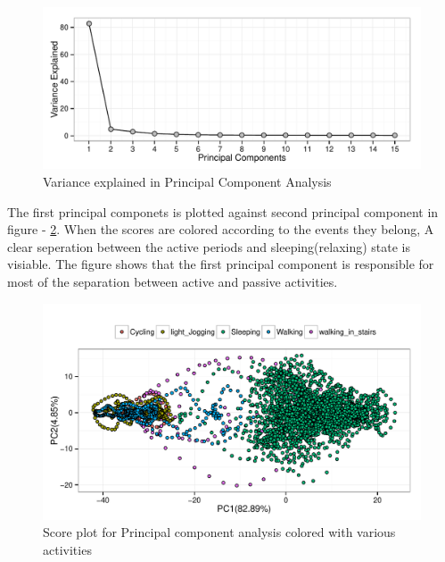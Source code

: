 \documentclass[a4paper, 11pt]{report}\usepackage[]{graphicx}\usepackage[]{color}
\makeatletter
\def\maxwidth{ %
  \ifdim\Gin@nat@width>\linewidth
    \linewidth
  \else
    \Gin@nat@width
  \fi
}
\newenvironment{knitrout}{}{} %
\numberwithin{figure}{section}
\makeatother
\begin{document}
\begin{knitrout}
\color{fgcolor}\begin{figure}[H]
\includegraphics[width=\maxwidth]{figure/pca_plot-1} \caption[Variance explained in Principal Component Analysis]{Variance explained in Principal Component Analysis}\label{fig:pca.plot}
\end{figure}


\end{knitrout}

The first principal componets is plotted against second principal component in figure - \ref{fig:pca.score.plot}. When the scores are colored according to the events they belong, A clear seperation between the active periods and sleeping(relaxing) state is visiable. The figure shows that the first principal component is responsible for most of the separation between active and passive activities.

\begin{knitrout}
\color{fgcolor}\begin{figure}[H]
\includegraphics[width=\maxwidth]{figure/pca_score_plot-1} \caption[Score plot for Principal component analysis colored with various activities]{Score plot for Principal component analysis colored with various activities}\label{fig:pca.score.plot}
\end{figure}


\end{knitrout}
\end{document}
